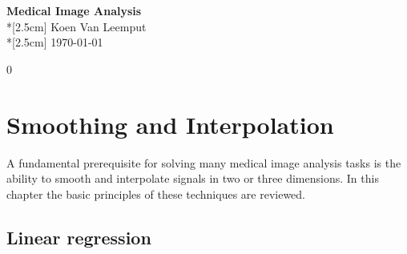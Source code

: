 \documentclass[10pt,twoside]{book}
\def\hideChapterSmoothingAndInterpolation{0}
\begin{document}
\thispagestyle{empty}

\vspace*{\fill}

\begin{center}
{\huge \textbf{Medical Image Analysis}}\\*[2.5cm]
{\Large Koen Van Leemput}\\*[2.5cm]
{\large \today}

\end{center}

\vspace*{\fill}

\newpage
\thispagestyle{empty}


\frontmatter
{}



\graphicspath{%
  {./figures/smoothingAndInterpolation/}%
  {./figures/registration/}%
  {./figures/modelBasedSegmentation/}%
  {./figures/neuralNets/}%
  {./figures/atlases/}%
  {./figures/validation/}%
  }

\tableofcontents

\clearpage


\newcommand{\bldgr}[1]{{\mbox{\boldmath {${#1}$}}}} %
\newcommand{\fat}[1]{\mathbf{#1}} %
\newcommand{\transp}{^\mathrm{T}} %
\newcommand{\N}{\mathcal N \mathnormal}


\mainmatter


\clearpage

\if\hideChapterSmoothingAndInterpolation0

\chapter{Smoothing and Interpolation}
\label{chap:smoothingAndInterpolation}

A fundamental prerequisite for solving many medical image analysis tasks is the ability to smooth and interpolate signals in two or three dimensions. In this chapter the basic principles of these techniques are reviewed.


\section{Linear regression}
\label{sec:linearRegression}
\end{document}
